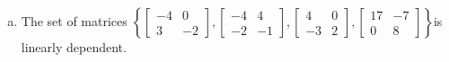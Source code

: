 \begin{exerciseAnswer}
\begin{enumerate}[(a)]
\item The set of matrices \( \left\{ \left[\begin{array}{cc}
-4 & 0 \\
3 & -2
\end{array}\right] , \left[\begin{array}{cc}
-4 & 4 \\
-2 & -1
\end{array}\right] , \left[\begin{array}{cc}
4 & 0 \\
-3 & 2
\end{array}\right] , \left[\begin{array}{cc}
17 & -7 \\
0 & 8
\end{array}\right] \right\} \)is linearly dependent.
\end{enumerate}
    
\end{exerciseAnswer}
    
